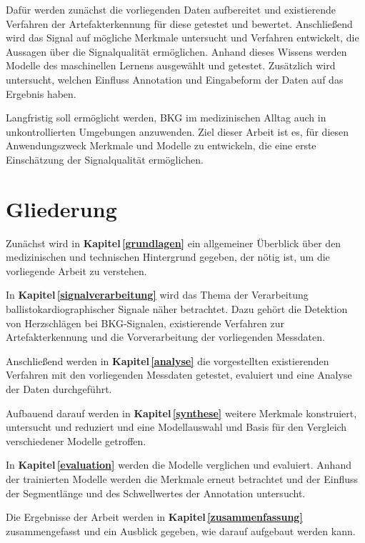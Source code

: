 Dafür werden zunächst die vorliegenden Daten aufbereitet und existierende Verfahren der Artefakterkennung für diese getestet und bewertet. Anschließend wird das Signal auf mögliche Merkmale untersucht und Verfahren entwickelt, die Aussagen über die Signalqualität ermöglichen. Anhand dieses Wissens werden Modelle des maschinellen Lernens ausgewählt und getestet. Zusätzlich wird untersucht, welchen Einfluss Annotation und Eingabeform der Daten auf das Ergebnis haben.

Langfristig soll ermöglicht werden, \acf{BKG} im medizinischen Alltag auch in unkontrollierten Umgebungen anzuwenden. Ziel dieser Arbeit ist es, für diesen Anwendungszweck Merkmale und Modelle zu entwickeln, die eine erste Einschätzung der Signalqualität ermöglichen.

\section{Gliederung}

Zunächst wird in \textbf{Kapitel\,\ref{grundlagen}} ein allgemeiner Überblick über den medizinischen und technischen Hintergrund gegeben, der nötig ist, um die vorliegende Arbeit zu verstehen.

In \textbf{Kapitel\,\ref{signalverarbeitung}} wird das Thema der Verarbeitung ballistokardiographischer Signale näher betrachtet. Dazu gehört die Detektion von Herzschlägen bei \ac{BKG}-Signalen, existierende Verfahren zur Artefakterkennung und die Vorverarbeitung der vorliegenden Messdaten.

Anschließend werden in \textbf{Kapitel\,\ref{analyse}} die vorgestellten existierenden Verfahren mit den vorliegenden Messdaten getestet, evaluiert und eine Analyse der Daten durchgeführt.

Aufbauend darauf werden in \textbf{Kapitel\,\ref{synthese}} weitere Merkmale konstruiert, untersucht und reduziert und eine Modellauswahl und Basis für den Vergleich verschiedener Modelle getroffen.

In \textbf{Kapitel\,\ref{evaluation}} werden die Modelle verglichen und evaluiert. Anhand der trainierten Modelle werden die Merkmale erneut betrachtet und der Einfluss der Segmentlänge und des Schwellwertes der Annotation untersucht.

Die Ergebnisse der Arbeit werden in \textbf{Kapitel\,\ref{zusammenfassung}} zusammengefasst und ein Ausblick gegeben, wie darauf aufgebaut werden kann.